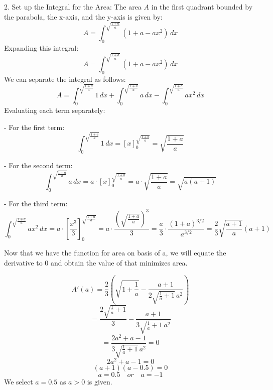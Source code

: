 \documentclass[12pt]{article}
\begin{document}
\begin{enumerate}[start=1,label={\bfseries. },leftmargin=1in]
2. Set up the Integral for the Area:  
   The area \( A \) in the first quadrant bounded by the parabola, the x-axis, and the y-axis is given by:
   \[
   A = \int_0^{\sqrt{\frac{1 + a}{a}}} \left(1 + a - ax^2\right) \, dx
   \]
   Expanding this integral:
   \[
   A = \int_0^{\sqrt{\frac{1 + a}{a}}} (1 + a - ax^2) \, dx
   \]
   We can separate the integral as follows:
   \[
   A = \int_0^{\sqrt{\frac{1 + a}{a}}} 1 \, dx + \int_0^{\sqrt{\frac{1 + a}{a}}} a \, dx - \int_0^{\sqrt{\frac{1 + a}{a}}} ax^2 \, dx
   \]
   Evaluating each term separately:
   
   - For the first term:
     \[
     \int_0^{\sqrt{\frac{1 + a}{a}}} 1 \, dx = \left[ x \right]_0^{\sqrt{\frac{1 + a}{a}}} = \sqrt{\frac{1 + a}{a}}
     \]
   
   - For the second term:
     \[
     \int_0^{\sqrt{\frac{1 + a}{a}}} a \, dx = a \cdot \left[ x \right]_0^{\sqrt{\frac{1 + a}{a}}} = a \cdot \sqrt{\frac{1 + a}{a}} = \sqrt{a(a + 1)}
     \]

   - For the third term:
     \[
     \int_0^{\sqrt{\frac{1 + a}{a}}} ax^2 \, dx = a \cdot \left[ \frac{x^3}{3} \right]_0^{\sqrt{\frac{1 + a}{a}}} = a \cdot \frac{\left( \sqrt{\frac{1 + a}{a}} \right)^3}{3} = \frac{a}{3} \cdot \frac{(1 + a)^{3/2}}{a^{3/2}} = \frac{2}{3} \sqrt{\frac{a + 1}{a}} (a + 1)
     \]

     Now that we have the function for area on basis of a, we will equate the derivative to 0 and obtain the value of that minimizes area.

     \[
     A'(a) =\frac{2}{3}\left(\sqrt{1 + \frac{1}{a}} - \frac{a + 1}{2 \sqrt{\frac{1}{a} + 1} \, a^{2}}
     \right)
     \]
     \[
     =\frac{2 \sqrt{\frac{1}{a} + 1}}{3} - \frac{a + 1}{3 \sqrt{\frac{1}{a} + 1} \, a^{2}}
     \]
     \[
     =\frac{2a^{2} + a - 1}{3 \sqrt{\frac{1}{a} + 1} \, a^{2}} = 0
     \]
     \[
     2a^2 + a -1 = 0
     \]
     \[
     (a+1)(a-0.5) = 0
     \]
     \[
     a=0.5 \quad or \quad a=-1
     \]
     We select $a=0.5$ as $a>0$ is given. 


\end{enumerate}
\end{document}
